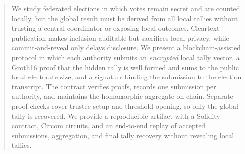 
\begin{abstract}

We study federated elections in which votes remain secret and are counted
locally, but the global result must be derived from all local tallies without
trusting a central coordinator or exposing local outcomes. Cleartext
publication makes inclusion auditable but sacrifices local privacy, while
commit-and-reveal only delays disclosure. We present a blockchain-assisted
protocol in which each authority submits an \emph{encrypted} local tally
vector, a Groth16 proof that the hidden tally is well formed and sums to the
public local electorate size, and a signature binding the submission to the
election transcript. The contract verifies proofs, records one submission per
authority, and maintains the homomorphic aggregate on-chain. Separate proof
checks cover trustee setup and threshold opening, so only the global tally is
recovered. We provide a reproducible artifact with a Solidity contract, Circom
circuits, and an end-to-end replay of accepted submissions, aggregation, and
final tally recovery without revealing local tallies.


\end{abstract}
